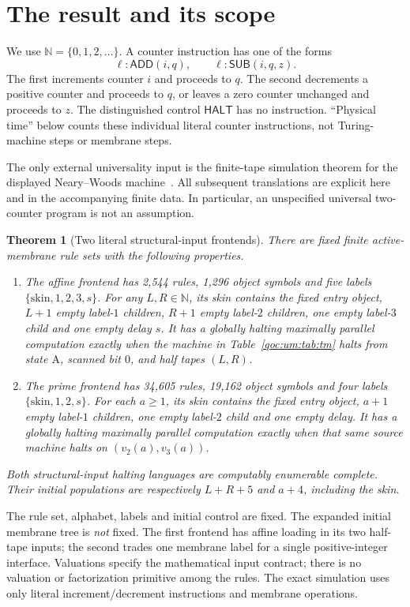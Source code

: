 \documentclass[11pt,letterpaper]{article}
\newtheorem{theorem}{Theorem}[section]
\theoremstyle{definition}
\theoremstyle{remark}
\newcommand{\N}{\mathbb N}
\newcommand{\HALT}{\mathsf{HALT}}
\newcommand{\ADD}{\mathsf{ADD}}
\newcommand{\SUB}{\mathsf{SUB}}
\newcommand{\skin}{\mathrm{skin}}
\begin{document}
\section{The result and its scope}\label{qoc:um:sec:intro}
We use $\N=\{0,1,2,\ldots\}$. A counter instruction has one of the forms
\[
 \ell:\ADD(i,q),\qquad \ell:\SUB(i,q,z).
\]
The first increments counter $i$ and proceeds to $q$. The second decrements a positive counter and proceeds to $q$, or leaves a zero counter unchanged and proceeds to $z$. The distinguished control $\HALT$ has no instruction. ``Physical time'' below counts these individual literal counter instructions, not Turing-machine steps or membrane steps.

The only external universality input is the finite-tape simulation theorem for the displayed Neary--Woods machine~\cite{um:NW}. All subsequent translations are explicit here and in the accompanying finite data. In particular, an unspecified universal two-counter program is not an assumption.

\begin{theorem}[Two literal structural-input frontends]\label{qoc:um:thm:main}
There are fixed finite active-membrane rule sets with the following properties.
\begin{enumerate}
\item The affine frontend has 2,544 rules, 1,296 object symbols and five labels $\{\skin,1,2,3,s\}$. For any $L,R\in\N$, its skin contains the fixed entry object, $L+1$ empty label-$1$ children, $R+1$ empty label-$2$ children, one empty label-$3$ child and one empty delay $s$. It has a globally halting maximally parallel computation exactly when the machine in Table~\ref{qoc:um:tab:tm} halts from state $\mathrm A$, scanned bit $0$, and half tapes $(L,R)$.
\item The prime frontend has 34,605 rules, 19,162 object symbols and four labels $\{\skin,1,2,s\}$. For each $a\geq1$, its skin contains the fixed entry object, $a+1$ empty label-$1$ children, one empty label-$2$ child and one empty delay. It has a globally halting maximally parallel computation exactly when that same source machine halts on $(v_2(a),v_3(a))$.
\end{enumerate}
Both structural-input halting languages are computably enumerable complete. Their initial populations are respectively $L+R+5$ and $a+4$, including the skin.
\end{theorem}

The rule set, alphabet, labels and initial control are fixed. The expanded initial membrane tree is \emph{not} fixed. The first frontend has affine loading in its two half-tape inputs; the second trades one membrane label for a single positive-integer interface. Valuations specify the mathematical input contract; there is no valuation or factorization primitive among the rules. The exact simulation uses only literal increment/decrement instructions and membrane operations.
\end{document}
